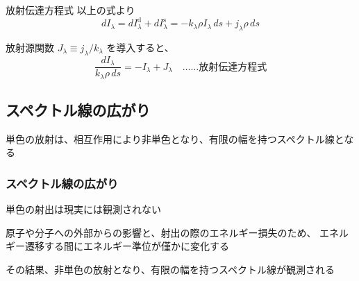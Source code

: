 \documentclass[unicode,colorlinks]{beamer}
\begin{document}
\begin{frame}{放射伝達方程式}
	以上の式より
	\[
		dI_\lambda=dI_\lambda^\mathrm{d}+dI_\lambda^\mathrm{s}
		=-k_\lambda\rho I_\lambda\,ds+j_\lambda\rho\,ds
	\]

	放射源関数 $J_\lambda\equiv j_\lambda/k_\lambda$ を導入すると、
	\[\frac{dI_\lambda}{k_\lambda\rho\,ds}=-I_\lambda+J_\lambda\quad\text{……放射伝達方程式}\]
\end{frame}

\begin{frame}
	\section{スペクトル線の広がり}
	単色の放射は、相互作用により非単色となり、有限の幅を持つスペクトル線となる
\end{frame}

\begin{frame}
	\frametitle{スペクトル線の広がり}
	単色の射出は現実には観測されない

	原子や分子への外部からの影響と、射出の際のエネルギー損失のため、
	エネルギー遷移する間にエネルギー準位が僅かに変化する

	その結果、非単色の放射となり、有限の幅を持つスペクトル線が観測される
\end{frame}
\end{document}
